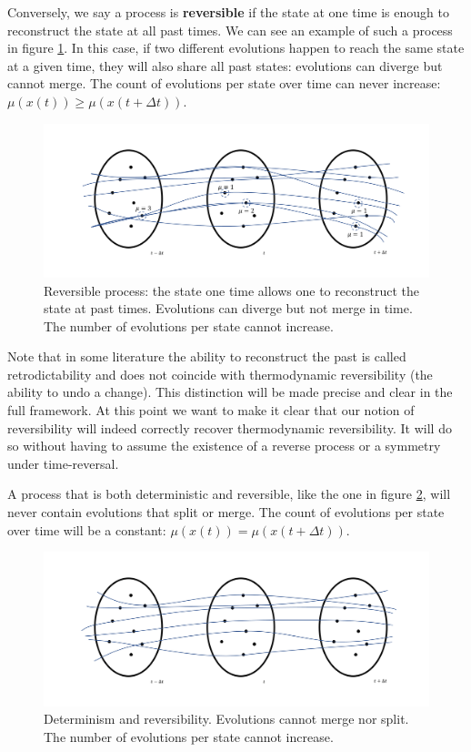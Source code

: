 \documentclass[letterpaper,twocolumn]{article}
\begin{document}
Conversely, we say a process is \textbf{reversible} if the state at one time is enough to reconstruct the state at all past times. We can see an example of such a process in figure \ref{fig_reversibility}. In this case, if two different evolutions happen to reach the same state at a given time, they will also share all past states: evolutions can diverge but cannot merge. The count of evolutions per state over time can never increase: $
\mu(x(t)) \geq \mu(x(t + \Delta t))$.

\begin{figure}[h!]
	\includegraphics[width=\columnwidth]{images/Slide4.png}
	\caption{Reversible process: the state one time allows one to reconstruct the state at past times. Evolutions can diverge but not merge in time. The number of evolutions per state cannot increase.}\label{fig_reversibility}
\end{figure}

Note that in some literature the ability to reconstruct the past is called retrodictability and does not coincide with thermodynamic reversibility (the ability to undo a change). This distinction will be made precise and clear in the full framework. At this point we want to make it clear that our notion of reversibility will indeed correctly recover thermodynamic reversibility. It will do so without having to assume the existence of a reverse process or a symmetry under time-reversal.

A process that is both deterministic and reversible, like the one in figure \ref{fig_detrev}, will never contain evolutions that split or merge. The count of evolutions per state over time will be a constant: $\mu(x(t)) = \mu(x(t + \Delta t))$.

\begin{figure}[h!]
	\includegraphics[width=\columnwidth]{images/Slide5.png}
	\caption{Determinism and reversibility. Evolutions cannot merge nor split. The number of evolutions per state cannot increase.}\label{fig_detrev}
\end{figure}
\end{document}
